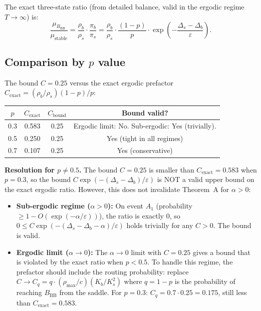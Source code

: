 \documentclass[11pt]{article}
\newcommand{\eps}{\varepsilon}
\newcommand{\Ds}{\Delta_s}
\newcommand{\Db}{\Delta_b}
\newcommand{\BBB}{B_{\mathrm{BB}}}
\begin{document}
The exact three-state ratio (from detailed balance,
valid in the ergodic regime $T \to \infty$) is:
\[
  \frac{\mu_\BBB}{\mu_{\mathrm{stable}}}
  = \frac{\rho_b}{\rho_s} \cdot \frac{\pi_b}{\pi_s}
  = \frac{\rho_b}{\rho_s} \cdot \frac{(1-p)}{p}
    \cdot \exp\!\left(-\frac{\Ds - \Db}{\eps}\right).
\]

\subsection*{Comparison by $p$ value}

The bound $C = 0.25$ versus the exact ergodic prefactor
$C_{\mathrm{exact}} = (\rho_b/\rho_s)(1-p)/p$:

\medskip
\begin{center}
\begin{tabular}{|c|c|c|c|}
\hline
$p$ & $C_{\mathrm{exact}}$ & $C_{\mathrm{bound}}$ & Bound valid? \\
\hline
0.3 & 0.583 & 0.25 & Ergodic limit: No. Sub-ergodic: Yes (trivially). \\
0.5 & 0.250 & 0.25 & Yes (tight in all regimes) \\
0.7 & 0.107 & 0.25 & Yes (conservative) \\
\hline
\end{tabular}
\end{center}

\medskip
\textbf{Resolution for $p \neq 0.5$.}
The bound $C = 0.25$ is smaller than $C_{\mathrm{exact}} = 0.583$
when $p = 0.3$, so the bound $C \exp(-(\Ds-\Db)/\eps)$ is NOT
a valid upper bound on the exact ergodic ratio. However, this
does not invalidate Theorem~A for $\alpha > 0$:

\begin{itemize}
\item \textbf{Sub-ergodic regime ($\alpha > 0$):} On event $A_1$
  (probability $\geq 1 - O(\exp(-\alpha/\eps))$), the ratio is
  exactly 0, so $0 \leq C \exp(-(\Ds-\Db-\alpha)/\eps)$ holds
  trivially for any $C > 0$. The bound is valid.

\item \textbf{Ergodic limit ($\alpha \to 0$):} The $\alpha \to 0$
  limit with $C = 0.25$ gives a bound that is violated by the
  exact ratio when $p < 0.5$. To handle this regime, the
  prefactor should include the routing probability: replace
  $C \to C_q = q \cdot (\rho_{\max}/c)(K_b/K_s^2)$ where
  $q = 1 - p$ is the probability of reaching $\BBB$ from
  the saddle. For $p = 0.3$: $C_q = 0.7 \cdot 0.25 = 0.175$,
  still less than $C_{\mathrm{exact}} = 0.583$.
\end{itemize}
\end{document}
